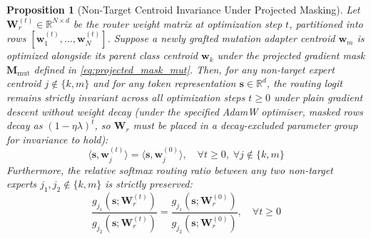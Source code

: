 \documentclass{article}
\newtheorem{proposition}[theorem]{Proposition}
\theoremstyle{definition}
\begin{document}
\begin{proposition}[Non-Target Centroid Invariance Under Projected Masking]
\label{prop:mutation_invariance}
Let $\mathbf{W}_r^{(t)} \in \mathbb{R}^{N \times d}$ be the router weight matrix at optimization step $t$, partitioned into rows $[\mathbf{w}_1^{(t)}, \dots, \mathbf{w}_N^{(t)}]$. Suppose a newly grafted mutation adapter centroid $\mathbf{w}_m$ is optimized alongside its parent class centroid $\mathbf{w}_k$ under the projected gradient mask $\mathbf{M}_{\mathrm{mut}}$ defined in \cref{eq:projected_mask_mut}. Then, for any non-target expert centroid $j \notin \{k, m\}$ and for any token representation $\mathbf{s} \in \mathbb{R}^d$, the routing logit remains strictly invariant across all optimization steps $t \ge 0$ under plain gradient descent without weight decay (under the specified AdamW optimiser, masked rows decay as $(1-\eta\lambda)^t$, so $\mathbf{W}_r$ must be placed in a decay-excluded parameter group for invariance to hold):
\begin{equation}
\langle \mathbf{s}, \mathbf{w}_j^{(t)} \rangle = \langle \mathbf{s}, \mathbf{w}_j^{(0)} \rangle, \quad \forall t \ge 0, \; \forall j \notin \{k, m\}
\label{eq:logit_invariance}
\end{equation}
Furthermore, the relative softmax routing ratio between any two non-target experts $j_1, j_2 \notin \{k, m\}$ is strictly preserved:
\begin{equation}
\frac{g_{j_1}(\mathbf{s}; \mathbf{W}_r^{(t)})}{g_{j_2}(\mathbf{s}; \mathbf{W}_r^{(t)})} = \frac{g_{j_1}(\mathbf{s}; \mathbf{W}_r^{(0)})}{g_{j_2}(\mathbf{s}; \mathbf{W}_r^{(0)})}, \quad \forall t \ge 0
\label{eq:ratio_invariance}
\end{equation}
\end{proposition}
\end{document}
